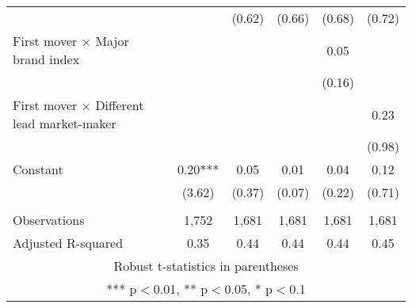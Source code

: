 \documentclass[]{article}
\begin{document}
\begin{tabular}{lccccc}
 &  & (0.62) & (0.66) & (0.68) & (0.72) \\
First mover $\times$ Major brand index &  &  &  & 0.05 &  \\
 &  &  &  & (0.16) &  \\
First mover $\times$ Different lead market-maker &  &  &  &  & 0.23 \\
 &  &  &  &  & (0.98) \\
Constant & 0.20*** & 0.05 & 0.01 & 0.04 & 0.12 \\
 & (3.62) & (0.37) & (0.07) & (0.22) & (0.71) \\
 &  &  &  &  &  \\
Observations & 1,752 & 1,681 & 1,681 & 1,681 & 1,681 \\
 Adjusted R-squared & 0.35 & 0.44 & 0.44 & 0.44 & 0.45 \\ \hline
\multicolumn{6}{c}{ Robust t-statistics in parentheses} \\
\multicolumn{6}{c}{ *** p$<$0.01, ** p$<$0.05, * p$<$0.1} \\
\end{tabular}
\end{document}
